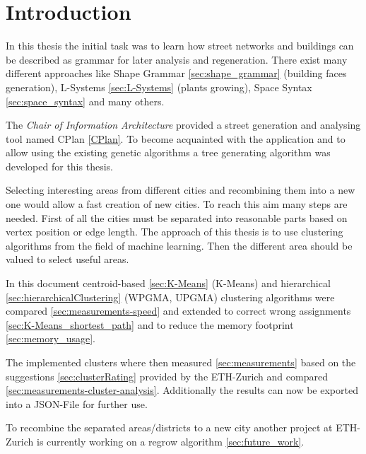 \chapter{Introduction}
In this thesis the initial task was to learn how street networks and buildings can be described as grammar for later analysis and regeneration. There exist many different approaches like Shape Grammar \ref{sec:shape_grammar} (building faces generation), L-Systems \ref{sec:L-Systems} (plants growing), Space Syntax \ref{sec:space_syntax} and many others. 

The \textit{Chair of Information Architecture} provided a street generation and analysing tool named CPlan \ref{CPlan}. To become acquainted with the application and to allow using the existing genetic algorithms a tree generating algorithm was developed for this thesis. 

Selecting interesting areas from different cities and recombining them into a new one would allow a fast creation of new cities. To reach this aim many steps are needed. First of all the cities must be separated into reasonable parts based on vertex position or edge length. The approach of this thesis is to use clustering algorithms from the field of machine learning. Then the different area should be valued to select useful areas.

In this document centroid-based \ref{sec:K-Means} (K-Means) and hierarchical \ref{sec:hierarchicalClustering} (WPGMA, UPGMA) clustering algorithms were compared \ref{sec:measurements-speed} and extended to correct wrong assignments \ref{sec:K-Means_shortest_path} and to reduce the memory footprint \ref{sec:memory_usage}. %

The implemented clusters where then measured \ref{sec:measurements} based on the suggestions \ref{sec:clusterRating} provided by the ETH-Zurich and compared \ref{sec:measurements-cluster-analysis}. Additionally the results can now be exported into a JSON-File for further use.

To recombine the separated areas/districts to a new city another project at ETH-Zurich is currently working on a regrow algorithm \ref{sec:future_work}. 